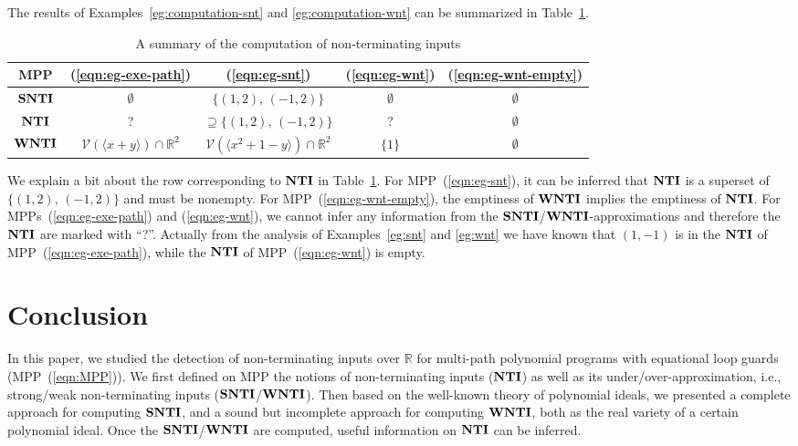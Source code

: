 \documentclass{jssc}
\newcommand{\V}{\mathcal{V}}
\newcommand{\NTI}{{\bf NTI}}
\newcommand{\SNTI}{{\bf SNTI}}
\newcommand{\WNTI}{{\bf WNTI}}
\begin{document}
The results of Examples~\ref{eg:computation-snt} and \ref{eg:computation-wnt} can be summarized in Table~\ref{tbl:snt-wnt-nt}.
\begin{table}
\begin{center}
\caption{\small A summary of the computation of non-terminating inputs}\label{tbl:snt-wnt-nt}
\vskip 1mm
\begin{tabular}{|c|c|c|c|c|}
  \hline
  MPP & (\ref{eqn:eg-exe-path}) & (\ref{eqn:eg-snt}) & (\ref{eqn:eg-wnt}) & (\ref{eqn:eg-wnt-empty}) \\
  \hline
  $\SNTI$ & $\emptyset$ & $\{(1,2),\,(-1,2)\}$ & $\emptyset$ & $\emptyset$ \\
  $\NTI$ & ? & $\supseteq \{(1,2),\,(-1,2)\} $ & ? & $\emptyset$ \\
  $\WNTI$ & $\V(\langle x+y\rangle) \cap \mathbb{R}^2$ & $\V(\langle x^2+1-y \rangle ) \cap \mathbb{R}^2$ & $\{1\}$ & $\emptyset$ \\
  \hline
\end{tabular}
\end{center}
\end{table}

We explain a bit about the row corresponding to $\NTI$ in Table~\ref{tbl:snt-wnt-nt}. For MPP~(\ref{eqn:eg-snt}), it can be inferred that $\NTI$ is a superset of $\{(1,2),\,(-1,2)\}$ and must be nonempty. For MPP~(\ref{eqn:eg-wnt-empty}), the emptiness of $\WNTI$ implies the emptiness of $\NTI$. For MPPs~(\ref{eqn:eg-exe-path}) and (\ref{eqn:eg-wnt}), we cannot infer any information from the $\SNTI$/$\WNTI$-approximations and therefore the $\NTI$ are marked with ``?''. Actually from the analysis of Examples~\ref{eg:snt} and \ref{eg:wnt} we have known that $(1,-1)$ is in the $\NTI$ of MPP~(\ref{eqn:eg-exe-path}), while the $\NTI$ of MPP~(\ref{eqn:eg-wnt}) is empty.


\section{Conclusion}\label{sec:conc}
In this paper, we studied the detection of non-terminating inputs over $\mathbb{R}$ for multi-path polynomial programs with equational loop guards (MPP~(\ref{eqn:MPP})). We first defined on MPP the notions of non-terminating inputs ($\NTI$) as well as its under/over-approximation, i.e., strong/weak non-terminating inputs ($\SNTI$/$\WNTI$). Then based on the well-known theory of polynomial ideals, we presented a complete approach for computing $\SNTI$, and a sound but incomplete approach for computing $\WNTI$, both as the real variety of a certain polynomial ideal. Once the $\SNTI$/$\WNTI$ are computed, useful information on $\NTI$ can be inferred.
\end{document}
